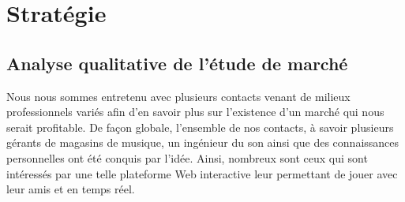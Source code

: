 \documentclass[a4,12pt]{article}
\begin{document}
\section{Stratégie}
\subsection{Analyse qualitative de l'étude de marché}
Nous nous sommes entretenu avec plusieurs contacts venant de milieux professionnels variés afin d'en savoir plus sur l'existence d'un marché qui nous serait profitable. De façon globale, l'ensemble de nos contacts, à savoir plusieurs gérants de magasins de musique, un ingénieur du son ainsi que des connaissances personnelles ont été conquis par l'idée. Ainsi, nombreux sont ceux qui sont intéressés par une telle plateforme Web interactive leur permettant de jouer avec leur amis et en temps réel.\\
\\
\end{document}
